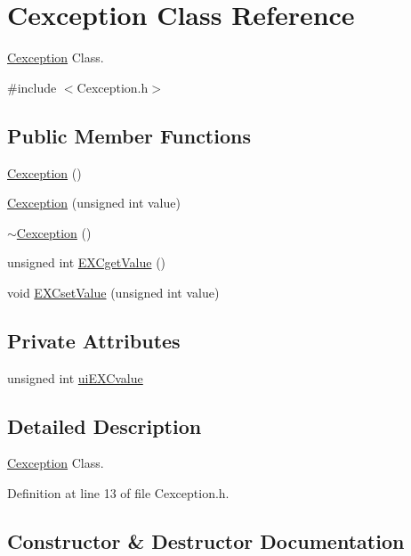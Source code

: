 \hypertarget{class_cexception}{}\section{Cexception Class Reference}
\label{class_cexception}


\hyperlink{class_cexception}{Cexception} Class.  




{\ttfamily \#include $<$Cexception.\+h$>$}

\subsection*{Public Member Functions}
\begin{DoxyCompactItemize}
\item 
\hyperlink{class_cexception_ab405f70e317c3ab806a1e98512b02fa2}{Cexception} ()
\item 
\hyperlink{class_cexception_a39c50b3913b606b729cd0211e27902cb}{Cexception} (unsigned int value)
\item 
\hyperlink{class_cexception_a308feac5ceac63caf6814c0a94f54bb4}{$\sim$\+Cexception} ()
\item 
unsigned int \hyperlink{class_cexception_a3641e8d7da2492aaa2452331d499803a}{E\+X\+Cget\+Value} ()
\item 
void \hyperlink{class_cexception_a4956cb3f1a9423b168c53e3efc0aeaa2}{E\+X\+Cset\+Value} (unsigned int value)
\end{DoxyCompactItemize}
\subsection*{Private Attributes}
\begin{DoxyCompactItemize}
\item 
unsigned int \hyperlink{class_cexception_a59c6688c85d1d0c84a2a93b6ea53c435}{ui\+E\+X\+Cvalue}
\end{DoxyCompactItemize}


\subsection{Detailed Description}
\hyperlink{class_cexception}{Cexception} Class. 

Definition at line 13 of file Cexception.\+h.



\subsection{Constructor \& Destructor Documentation}
\hypertarget{class_cexception_ab405f70e317c3ab806a1e98512b02fa2}{}
